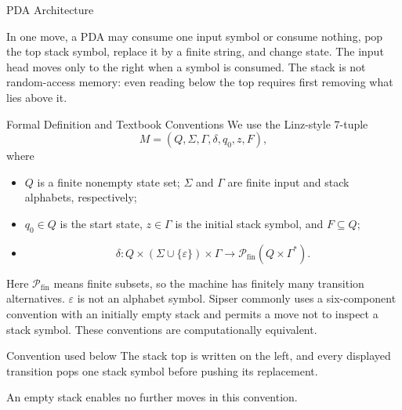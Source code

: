 \documentclass[10pt]{beamer}
\begin{document}
\begin{frame}{PDA Architecture}
  \begin{center}
  \end{center}
  In one move, a PDA may consume one input symbol or consume nothing, pop the top stack symbol,
  replace it by a finite string, and change state.
  \pause
  The input head moves only to the right when a symbol is consumed.
  The stack is not random-access memory: even reading below the top requires
  first removing what lies above it.
\end{frame}

\begin{frame}{Formal Definition and Textbook Conventions}
  \small
  We use the Linz-style 7-tuple
  \[
    M=(Q,\Sigma,\Gamma,\delta,q_0,z,F),
  \]
  \pause
  where
  \begin{itemize}
    \item $Q$ is a finite nonempty state set; $\Sigma$ and $\Gamma$ are finite
      input and stack alphabets, respectively;
    \item $q_0\in Q$ is the start state, $z\in\Gamma$ is the initial stack symbol, and $F\subseteq Q$;
    \item
      \[
        \delta:Q\times(\Sigma\cup\{\varepsilon\})\times\Gamma
        \to\mathcal{P}_{\mathrm{fin}}(Q\times\Gamma^*).
      \]
  \end{itemize}
  Here $\mathcal{P}_{\mathrm{fin}}$ means finite subsets, so the machine has
  finitely many transition alternatives. $\varepsilon$ is not an alphabet symbol.
  Sipser commonly uses a six-component convention with an initially empty stack and permits a move
  not to inspect a stack symbol. These conventions are computationally equivalent.
  \pause
  \begin{alertblock}{Convention used below}
    The stack top is written on the left, and every displayed transition pops one stack symbol before
    pushing its replacement.
  \end{alertblock}
  An empty stack enables no further moves in this convention.
\end{frame}
\end{document}
